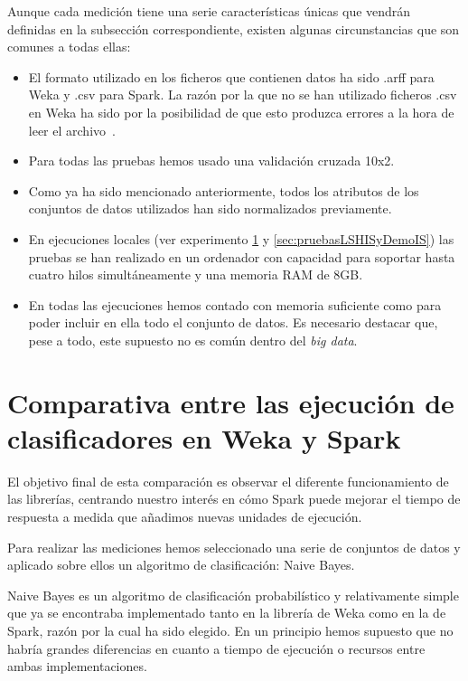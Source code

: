Aunque cada medición tiene una serie características únicas que vendrán definidas en la subsección correspondiente, existen algunas circunstancias que son comunes a todas ellas:

\begin{itemize}
	\item El formato utilizado en los ficheros que contienen datos ha sido .arff para Weka y .csv para Spark. La razón por la que no se han utilizado ficheros .csv en Weka ha sido por la posibilidad de que esto produzca errores a la hora de leer el archivo~\cite{CSVWeka}.
	\item Para todas las pruebas hemos usado una validación cruzada 10x2.
	\item Como ya ha sido mencionado anteriormente, todos los atributos de los conjuntos de datos utilizados han sido normalizados previamente.
	\item En ejecuciones locales (ver experimento \ref{sec:wekaSparkComp} y \ref{sec:pruebasLSHISyDemoIS}) las pruebas se han realizado en un ordenador con capacidad para soportar hasta cuatro hilos simultáneamente y una memoria RAM de 8GB.
	\item En todas las ejecuciones hemos contado con memoria suficiente como para poder incluir en ella todo el conjunto de datos. Es necesario destacar que, pese a todo, este supuesto no es común dentro del \textit{big data}.
	
\end{itemize}



\section{Comparativa entre las ejecución de clasificadores en Weka y Spark}\label{sec:wekaSparkComp}

El objetivo final de esta comparación es observar el diferente funcionamiento de las librerías, centrando nuestro interés en cómo Spark puede mejorar el tiempo de respuesta a medida que añadimos nuevas unidades de ejecución.

Para realizar las mediciones hemos seleccionado una serie de conjuntos de datos y aplicado sobre ellos un algoritmo de clasificación: Naive Bayes.

Naive Bayes es un algoritmo de clasificación probabilístico y relativamente simple que ya se encontraba implementado tanto en la librería de Weka \cite{John1995} como en la de Spark, razón por la cual ha sido elegido. En un principio hemos supuesto que no habría grandes diferencias en cuanto a tiempo de ejecución o recursos entre ambas implementaciones.

